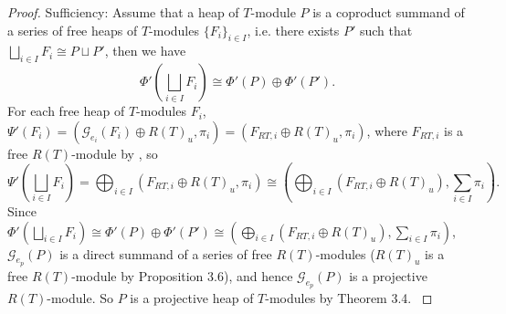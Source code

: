 \documentclass[11pt, twoside]{article}
\begin{document}
\begin{proof}
{Sufficiency: Assume that a heap of $T$-module $P$ is a coproduct summand of a series of free heaps of $T$-modules $\{F_i\}_{i \in I}$, i.e. there exists $P'$ such that $\bigsqcup_{i \in I}F_i \cong P \sqcup P'$, then we have
$$\Phi'(\bigsqcup_{i \in I}F_i) \cong \Phi'(P) \oplus \Phi'(P').$$
For each free heap of $T$-modules $F_i$, $\Psi'(F_i) = (\mathcal{G}_{e_i}(F_i) \oplus R(T)_u,\pi_i) = (F_{RT,i} \oplus R(T)_u,\pi_i)$, where $F_{RT,i}$ is a free $R(T)$-module by \cite[Proposition 3.4]{mb}, so
$$\Psi'(\bigsqcup_{i \in I}F_i) = \bigoplus_{i \in I}(F_{RT,i} \oplus R(T)_u,\pi_i) \cong (\bigoplus_{i \in I}(F_{RT,i} \oplus R(T)_u),\sum_{i \in I}\pi_i).$$
Since $\Phi'(\bigsqcup_{i \in I}F_i) \cong \Phi'(P) \oplus \Phi'(P') \cong (\bigoplus_{i \in I}(F_{RT,i} \oplus R(T)_u),\sum_{i \in I}\pi_i)$, $\mathcal{G}_{e_p}(P)$ is a direct summand of a series of free $R(T)$-modules ($R(T)_u$ is a free $R(T)$-module by Proposition 3.6), and hence $\mathcal{G}_{e_p}(P)$ is a projective $R(T)$-module. So $P$ is a projective heap of $T$-modules by Theorem 3.4.
}
\end{proof}
\end{document}
